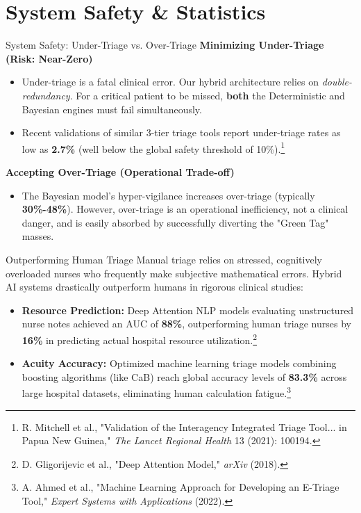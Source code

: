 \documentclass[11pt, aspectratio=169]{beamer}
\begin{document}
	\section{System Safety \& Statistics}
	\begin{frame}{System Safety: Under-Triage vs. Over-Triage}
		\textbf{Minimizing Under-Triage (Risk: Near-Zero)}
		\begin{itemize}
			\item Under-triage is a fatal clinical error. Our hybrid architecture relies on \textit{double-redundancy}. For a critical patient to be missed, \textbf{both} the Deterministic and Bayesian engines must fail simultaneously.
			\item Recent validations of similar 3-tier triage tools report under-triage rates as low as \textbf{2.7\%} (well below the global safety threshold of 10\%).\footnote{R. Mitchell et al., "Validation of the Interagency Integrated Triage Tool... in Papua New Guinea," \textit{The Lancet Regional Health} 13 (2021): 100194.}
		\end{itemize}
		\vspace{0.2cm}
		\textbf{Accepting Over-Triage (Operational Trade-off)}
		\begin{itemize}
			\item The Bayesian model's hyper-vigilance increases over-triage (typically \textbf{30\%-48\%}). However, over-triage is an operational inefficiency, not a clinical danger, and is easily absorbed by successfully diverting the "Green Tag" masses.
		\end{itemize}
	\end{frame}
	
	\begin{frame}{Outperforming Human Triage}
		Manual triage relies on stressed, cognitively overloaded nurses who frequently make subjective mathematical errors. Hybrid AI systems drastically outperform humans in rigorous clinical studies:
		\vspace{0.3cm}
		\begin{itemize}
			\item \textbf{Resource Prediction:} Deep Attention NLP models evaluating unstructured nurse notes achieved an AUC of \textbf{88\%}, outperforming human triage nurses by \textbf{16\%} in predicting actual hospital resource utilization.\footnote{D. Gligorijevic et al., "Deep Attention Model," \textit{arXiv} (2018).}
			\item \textbf{Acuity Accuracy:} Optimized machine learning triage models combining boosting algorithms (like CaB) reach global accuracy levels of \textbf{83.3\%} across large hospital datasets, eliminating human calculation fatigue.\footnote{A. Ahmed et al., "Machine Learning Approach for Developing an E-Triage Tool," \textit{Expert Systems with Applications} (2022).}
		\end{itemize}
	\end{frame}
	
\end{document}

